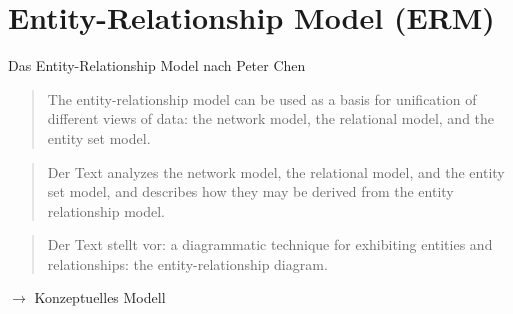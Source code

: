 
\section{Entity-Relationship Model (ERM)}

\begin{frame}{Das Entity-Relationship Model nach Peter Chen}
\begin{block}{\cite[9]{chen1976}}
    \begin{quote}
        The entity-relationship model can be used as a basis for unification of different views of data: the network model, the relational model, and the entity set model.~
    \end{quote}
\end{block}
\begin{block}{\cite[10]{chen1976}}
    \begin{quote}
        \lbrack{}Der Text\rbrack{} analyzes the network model, the relational model, and the entity set model, and describes how they may be derived from the entity relationship model.~
    \end{quote}
\end{block}
\begin{block}{\cite[19]{chen1976}}
    \begin{quote}
        \lbrack{}Der Text stellt vor:\rbrack{} a diagrammatic technique for exhibiting entities and relationships: the entity-relationship diagram.~%
    \end{quote}
\end{block}
$\to$ \alert{Konzeptuelles Modell}

\end{frame}

